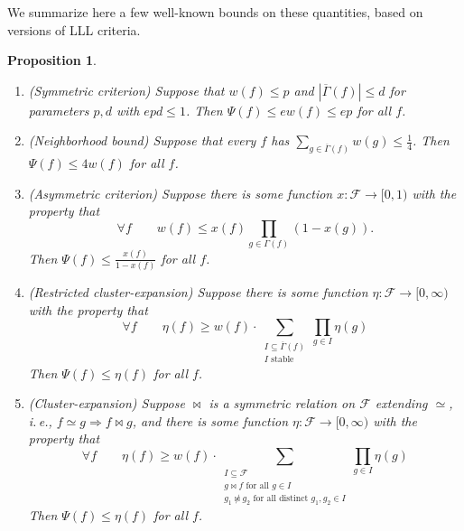 \documentclass[11pt]{article}
\newtheorem{proposition}[theorem]{Proposition}
\newcommand{\ie}{i.\,e.}
\begin{document}
  We summarize here a few well-known bounds  on these quantities, based on versions of LLL criteria.
\begin{proposition}
\label{main-bound-sum}
 \begin{enumerate}
\item (Symmetric criterion) Suppose that $w(f) \leq p$ and $|\overline \Gamma(f)| \leq d$ for parameters $p,d$ with $e p d \leq 1$.  Then $\Psi(f) \leq e w(f) \leq e p$ for all $f$.
\item (Neighborhood bound) Suppose that every $f$ has $\sum_{g \in \overline \Gamma(f)} w(g) \leq \tfrac{1}{4}$. Then $\Psi(f) \leq 4 w(f)$ for all  $f$.
\item (Asymmetric criterion) Suppose there is some function $x: \mathcal F \rightarrow [0,1)$ with the property that
$$
\forall f \qquad w(f) \leq x(f)  \prod_{g \in \Gamma(f)} (1 - x(g)).
$$
Then $\Psi(f) \leq \frac{x (f)}{1-x(f)}$ for all $f$.

\item (Restricted cluster-expansion) Suppose there is some function $\eta: \mathcal F \rightarrow [0,\infty)$ with the property that
$$
\forall f \qquad \eta(f) \geq w(f) \cdot \sum_{\substack{I \subseteq \overline \Gamma(f) \\ \text{$I$ stable}}} \prod_{g \in I} \eta(g)
$$
Then $\Psi(f) \leq \eta(f)$ for all $f$.


\item (Cluster-expansion) Suppose $\bowtie$ is a symmetric relation on $\mathcal F$ extending $\simeq$, \ie, $f \simeq g \Rightarrow f \bowtie g$, and there is some function $\eta: \mathcal F \rightarrow [0,\infty)$ with the property that
$$
\forall f \qquad \eta(f) \geq w(f) \cdot \sum_{\substack{I \subseteq \mathcal F \\ g \bowtie f \text{ for all $g \in I$}  \\ g_1 \not \bowtie g_2 \text{ for all distinct $g_1, g_2 \in I$}}} \prod_{g \in I} \eta(g)
$$
Then $\Psi(f) \leq \eta(f)$ for all $f$.
\end{enumerate}
\end{proposition}
\end{document}
